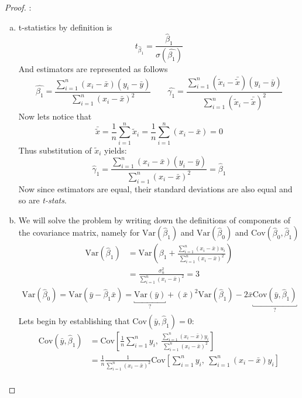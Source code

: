\documentclass[12pt,reqno]{amsart}
\theoremstyle{plain}
\newcommand{\V}{\text{Var}}
\newcommand{\C}{\text{Cov}}
\newcommand{\hb}{\hat\beta}
\begin{document}
\begin{proof}
    :
    \begin{enumerate}[(a)]
        \item t-statistics by definition is
              \[ t_{\hat\beta_1} = \frac{\hat\beta_{1}}{\sigma(\hat{\beta_1})}\]
              And estimators are represented as follows
              \[ \hat{\beta_1} = \frac{\sum_{i=1}^{n} (x_{i} - \bar{x})(y_i - \bar{y}) }{\sum_{i=1}^{n} (x_{i} - \bar{x})^{2}}
                  \quad\quad
                  \hat{\gamma_1} = \frac{\sum_{i=1}^{n} (\tilde{x}_{i} - \bar{\tilde{x}})(y_i - \bar{y}) }{\sum_{i=1}^{n} (\tilde{x}_{i} - \bar{\tilde{x}})^{2}} \]
              Now lets notice that
              \[ \bar{\tilde{x}}  = \frac{1}{n} \sum_{i=1}^{n} \tilde{x}_i = \frac{1}{n} \sum_{i=1}^{n} (x_i - \bar{x}) = 0\]
              Thus substitution of $ \tilde{x}_i $ yields:
              \[
                  \hat{\gamma}_1 =  \frac{\sum_{i=1}^{n} (x_{i} - \bar{x})(y_i - \bar{y}) }{\sum_{i=1}^{n} (x_{i} - \bar{x})^{2}} = \hat{\beta}_{1}
              \]
              Now since estimators are equal, their standard deviations are also equal and so are \textit{t-stats}.
        \item
              We will solve the problem by writing down the definitions of components of  the
              covariance matrix, namely for $ \V (\hb_1) $ and $ \V (\hb_0) $ and $ \text{Cov}(\hb_0, \hb_1) $
              \begin{align*}
                  \V (\hat{\beta}_1) & = \V \left( \beta_1 + \frac{\sum_{i=1}^{n} (x_i - \bar{x})u_i}{\sum_{i=1}^{n} (x_i - \bar{x})^{2}} \right)
                  \\ &= \frac{\sigma^{2}_u}{\sum_{i=1}^{n} (x_i - \bar{x})^{2}} = 3
              \end{align*}
              \begin{align*}
                  \V (\hb_0) = \V (\bar{y} - \hb_1 \bar{x}) = \underbracket{\V (\bar{y})}_{?} + (\bar{x})^{2} \V (\hb_1)
                  -2\bar{x} \underbracket{\text{Cov}(\bar{y}, \hb_1)}_{?}
              \end{align*}
              Lets begin by establishing that $ \text{Cov}(\bar{y}, \hb_1) = 0$:
              \begin{align*}
                  \text{Cov}(\bar{y}, \hb_1) & = \C \left[ \frac{1}{n} \sum_{i=1}^{n} y_i, ~ \frac{\sum_{i=1}^{n} (x_i - \bar{x})y_i}{\sum_{i=1}^{n} (x_i - \bar{x})^{2}} \right]  \\
                                             & = \frac{1}{n} \frac{1}{\sum_{i=1}^{n} (x_i - \bar{x})^{2}}\C \left[ \sum_{i=1}^{n} y_i, ~ \sum_{i=1}^{n} (x_i - \bar{x})y_i \right] \\

\end{align*}
\end{enumerate}
\end{proof}
\end{document}
